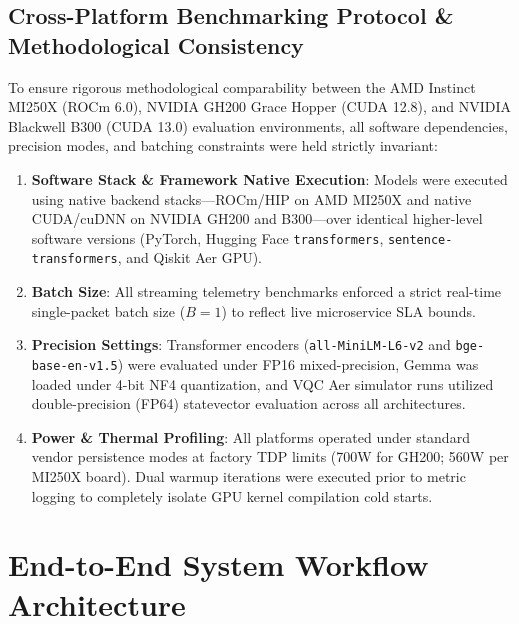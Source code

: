 \documentclass[journal]{IEEEtran}
\begin{document}
\subsection{Cross-Platform Benchmarking Protocol \& Methodological Consistency}
To ensure rigorous methodological comparability between the AMD Instinct MI250X (ROCm 6.0), NVIDIA GH200 Grace Hopper (CUDA 12.8), and NVIDIA Blackwell B300 (CUDA 13.0) evaluation environments, all software dependencies, precision modes, and batching constraints were held strictly invariant:
\begin{enumerate}
    \item \textbf{Software Stack \& Framework Native Execution}: Models were executed using native backend stacks—ROCm/HIP on AMD MI250X and native CUDA/cuDNN on NVIDIA GH200 and B300—over identical higher-level software versions (PyTorch, Hugging Face \texttt{transformers}, \texttt{sentence-transformers}, and Qiskit Aer GPU).
    \item \textbf{Batch Size}: All streaming telemetry benchmarks enforced a strict real-time single-packet batch size ($B=1$) to reflect live microservice SLA bounds.
    \item \textbf{Precision Settings}: Transformer encoders (\texttt{all-MiniLM-L6-v2} and \texttt{bge-base-en-v1.5}) were evaluated under FP16 mixed-precision, Gemma was loaded under 4-bit NF4 quantization, and VQC Aer simulator runs utilized double-precision (FP64) statevector evaluation across all architectures.
    \item \textbf{Power \& Thermal Profiling}: All platforms operated under standard vendor persistence modes at factory TDP limits (700W for GH200; 560W per MI250X board). Dual warmup iterations were executed prior to metric logging to completely isolate GPU kernel compilation cold starts.
\end{enumerate}


\section{End-to-End System Workflow Architecture}
\end{document}
